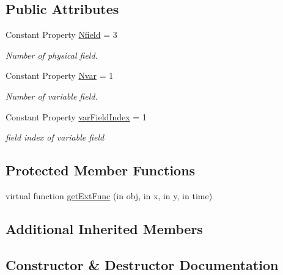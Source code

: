\subsection*{Public Attributes}
\begin{DoxyCompactItemize}
\item 
Constant Property \hyperlink{class_adv_abstract_var_flow2d_a09de0f1de500641da3e70c7bad1e45d0}{Nfield} = 3
\begin{DoxyCompactList}\small\item\em Number of physical field. \end{DoxyCompactList}\item 
Constant Property \hyperlink{class_adv_abstract_var_flow2d_a1f1e0803afe938463a95879dc45ce66e}{Nvar} = 1
\begin{DoxyCompactList}\small\item\em Number of variable field. \end{DoxyCompactList}\item 
Constant Property \hyperlink{class_adv_abstract_var_flow2d_ae97bb6910e3dbc7e7f9d77091b8fb50c}{var\+Field\+Index} = 1
\begin{DoxyCompactList}\small\item\em field index of variable field \end{DoxyCompactList}\end{DoxyCompactItemize}
\subsection*{Protected Member Functions}
\begin{DoxyCompactItemize}
\item 
virtual function \hyperlink{class_adv_abstract_var_flow2d_a86ffcd59c6795026d11e87e234fa3796}{get\+Ext\+Func} (in obj, in x, in y, in time)
\end{DoxyCompactItemize}
\subsection*{Additional Inherited Members}


\subsection{Constructor \& Destructor Documentation}
\mbox{\label{class_adv_abstract_var_flow2d_ad402f150cc82fa22684bc9fa4e80250e}} 
